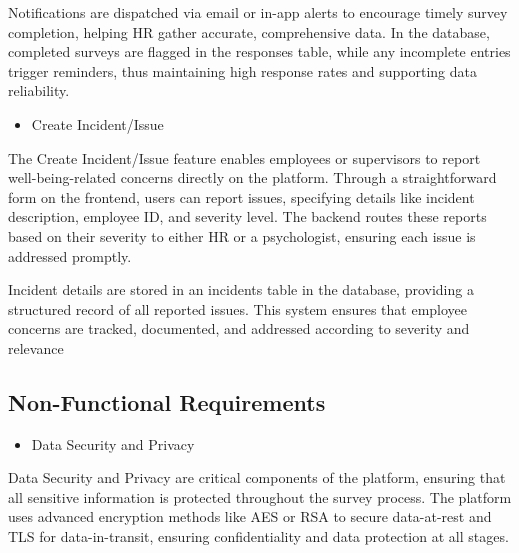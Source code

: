 \documentclass[conference]{IEEEtran}
\begin{document}
            Notifications are dispatched via email or in-app 
            alerts to encourage timely survey completion, helping HR gather 
            accurate, comprehensive data. In the database, completed surveys 
            are flagged in the responses table, while any incomplete entries
            trigger reminders, thus maintaining high response rates and 
            supporting data reliability.
            \newline    

            \begin{itemize}
                \item Create Incident/Issue
            \end{itemize}
    
            The Create Incident/Issue feature enables employees or supervisors 
            to report well-being-related concerns directly on the platform. 
            Through a straightforward form on the frontend, users can report 
            issues, specifying details like incident description, employee ID, 
            and severity level. The backend routes these reports based on their 
            severity to either HR or a psychologist, ensuring each issue is 
            addressed promptly. \newline
            
            Incident details are stored in an incidents
            table in the database, providing a structured record of all 
            reported issues. This system ensures that employee concerns are 
            tracked, documented, and addressed according to severity and 
            relevance
            \newline  
    
        \subsection {Non-Functional Requirements}
   
        \begin{itemize}
            \item Data Security and Privacy
        \end{itemize}
    
        Data Security and Privacy are critical components of the platform, 
        ensuring that all sensitive information is protected throughout the 
        survey process. The platform uses advanced encryption methods like 
        AES or RSA to secure data-at-rest and TLS for data-in-transit, 
        ensuring confidentiality and data protection at all stages. 
        \newline
    
\end{document}
